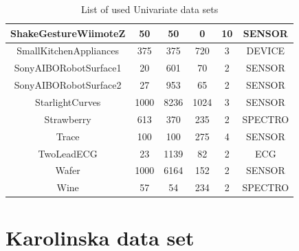 \begin{table}
\begin{center}
\begin{longtable}{||c|c|c|c|c|c||}
 \hline
 ShakeGestureWiimoteZ & 50 & 50 & 0 & 10 & SENSOR \\[1ex]
 \hline
 SmallKitchenAppliances & 375 & 375 & 720 & 3 & DEVICE \\[1ex]
 \hline
 SonyAIBORobotSurface1 & 20 & 601 & 70 & 2 & SENSOR \\[1ex]
 \hline
 SonyAIBORobotSurface2 & 27 & 953 & 65 & 2 & SENSOR \\[1ex]
 \hline
 StarlightCurves & 1000 & 8236 & 1024 & 3 & SENSOR \\[1ex]
 \hline
 Strawberry & 613 & 370 & 235 & 2 & SPECTRO \\[1ex]
 \hline
 Trace & 100 & 100 & 275 & 4 & SENSOR \\[1ex]
 \hline
 TwoLeadECG & 23 & 1139 & 82 & 2 & ECG \\[1ex]
 \hline
 Wafer & 1000 & 6164 & 152 & 2 & SENSOR \\[1ex]
 \hline
 Wine & 57 & 54 & 234 & 2 & SPECTRO
 \end{longtable}
\end{center}
\caption{List of used Univariate  data sets}
\label{table:Univariate}
\end{table}

\section{Karolinska  data set}
\label{Karolinska}